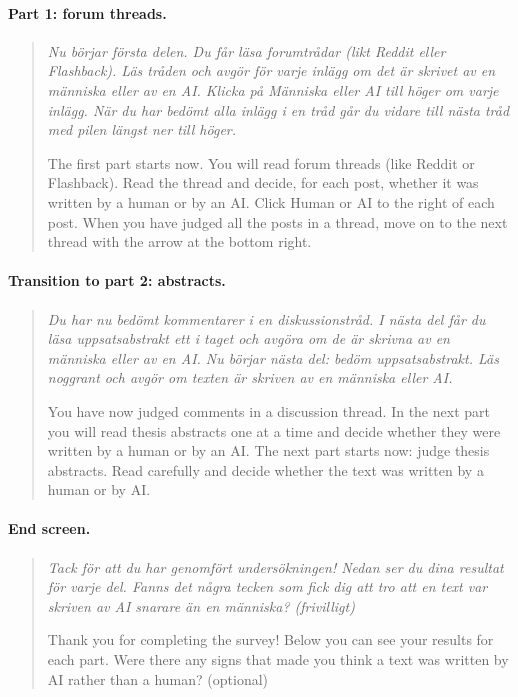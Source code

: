 \documentclass[thesis]{cluu}
\begin{document}
\paragraph{Part 1: forum threads.}
\begin{quote}\small
\textit{Nu börjar första delen. Du får läsa forumtrådar (likt Reddit eller Flashback). Läs tråden och avgör för varje inlägg om det är skrivet av en människa eller av en AI. Klicka på Människa eller AI till höger om varje inlägg. När du har bedömt alla inlägg i en tråd går du vidare till nästa tråd med pilen längst ner till höger.}

The first part starts now. You will read forum threads (like Reddit or Flashback). Read the thread and decide, for each post, whether it was written by a human or by an AI. Click Human or AI to the right of each post. When you have judged all the posts in a thread, move on to the next thread with the arrow at the bottom right.
\end{quote}

\paragraph{Transition to part 2: abstracts.}
\begin{quote}\small
\textit{Du har nu bedömt kommentarer i en diskussionstråd. I nästa del får du läsa uppsatsabstrakt ett i taget och avgöra om de är skrivna av en människa eller av en AI. Nu börjar nästa del: bedöm uppsatsabstrakt. Läs noggrant och avgör om texten är skriven av en människa eller AI.}

You have now judged comments in a discussion thread. In the next part you will read thesis abstracts one at a time and decide whether they were written by a human or by an AI. The next part starts now: judge thesis abstracts. Read carefully and decide whether the text was written by a human or by AI.
\end{quote}

\paragraph{End screen.}
\begin{quote}\small
\textit{Tack för att du har genomfört undersökningen! Nedan ser du dina resultat för varje del. Fanns det några tecken som fick dig att tro att en text var skriven av AI snarare än en människa? (frivilligt)}

Thank you for completing the survey! Below you can see your results for each part. Were there any signs that made you think a text was written by AI rather than a human? (optional)
\end{quote}
\end{document}
